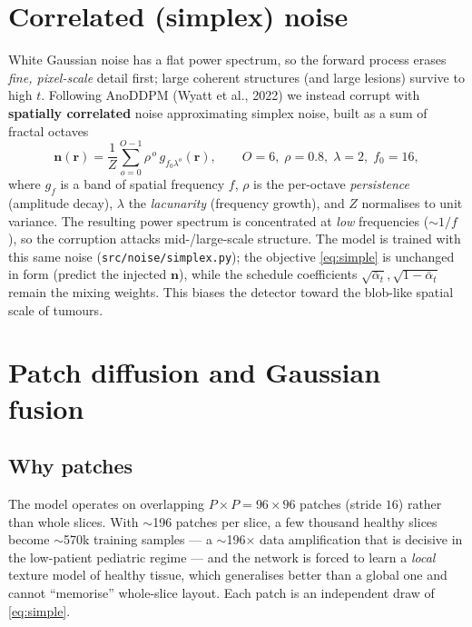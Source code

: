 \documentclass[12pt,a4paper]{article}
\newcommand{\abar}{\bar{\alpha}}
\begin{document}
\section{Correlated (simplex) noise}
White Gaussian noise has a flat power spectrum, so the forward process erases
\emph{fine, pixel-scale} detail first; large coherent structures (and large
lesions) survive to high $t$. Following AnoDDPM (Wyatt et al., 2022) we instead
corrupt with \textbf{spatially correlated} noise approximating simplex noise,
built as a sum of fractal octaves
\begin{equation}
\bm n(\bm r)=\frac{1}{Z}\sum_{o=0}^{O-1} \rho^{\,o}\,g_{f_0\lambda^{o}}(\bm r),
\qquad O=6,\;\rho=0.8,\;\lambda=2,\;f_0=16,
\label{eq:simplex}
\end{equation}
where $g_{f}$ is a band of spatial frequency $f$, $\rho$ is the per-octave
\emph{persistence} (amplitude decay), $\lambda$ the \emph{lacunarity} (frequency
growth), and $Z$ normalises to unit variance. The resulting power spectrum is
concentrated at \emph{low} frequencies ($\sim 1/f$), so the corruption attacks
mid-/large-scale structure. The model is trained with this same noise
(\texttt{src/noise/simplex.py}); the objective \eqref{eq:simple} is unchanged in
form (predict the injected $\bm n$), while the schedule coefficients
$\sqrt{\abar_t},\sqrt{1-\abar_t}$ remain the mixing weights. This biases the
detector toward the blob-like spatial scale of tumours.

\section{Patch diffusion and Gaussian fusion}
\subsection{Why patches}
The model operates on overlapping $P\times P=96\times96$ patches (stride $16$)
rather than whole slices. With $\sim$196 patches per slice, a few thousand
healthy slices become $\sim$570k training samples --- a $\sim$196$\times$ data
amplification that is decisive in the low-patient pediatric regime --- and the
network is forced to learn a \emph{local} texture model of healthy tissue, which
generalises better than a global one and cannot ``memorise'' whole-slice layout.
Each patch is an independent draw of \eqref{eq:simple}.
\end{document}
